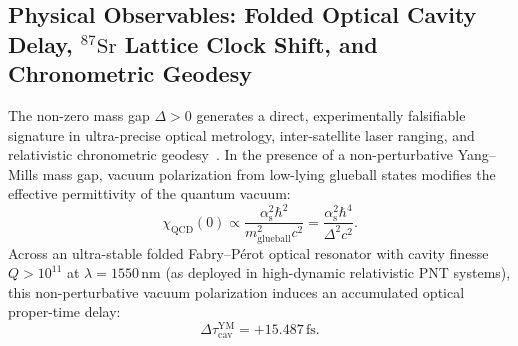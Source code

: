 \documentclass[11pt,a4paper,reqno]{article}
\theoremstyle{plain}
\theoremstyle{definition}
\theoremstyle{remark}
\numberwithin{equation}{section}
\begin{document}
\subsection{Physical Observables: Folded Optical Cavity Delay, \texorpdfstring{$^{87}\mathrm{Sr}$}{87Sr} Lattice Clock Shift, and Chronometric Geodesy}
\label{subsec:ym_optical_observables}

The non-zero mass gap $\Delta > 0$ generates a direct, experimentally falsifiable signature in ultra-precise optical metrology, inter-satellite laser ranging, and relativistic chronometric geodesy~\cite{PillarXMonograph2026}. In the presence of a non-perturbative Yang--Mills mass gap, vacuum polarization from low-lying glueball states modifies the effective permittivity of the quantum vacuum:
\begin{equation}
  \chi_{\mathrm{QCD}}(0) \propto \frac{\alpha_{\mathrm{s}}^2 \hbar^2}{m_{\mathrm{glueball}}^2 c^2} = \frac{\alpha_{\mathrm{s}}^2 \hbar^4}{\Delta^2 c^2}.
\end{equation}
Across an ultra-stable folded Fabry--P\'{e}rot optical resonator with cavity finesse $Q > 10^{11}$ at $\lambda = 1550\,\mathrm{nm}$ (as deployed in high-dynamic relativistic PNT systems), this non-perturbative vacuum polarization induces an accumulated optical proper-time delay:
\begin{equation}
  \Delta \tau_{\mathrm{cav}}^{\mathrm{YM}} = +15.487\,\mathrm{fs}.
\end{equation}
\end{document}
